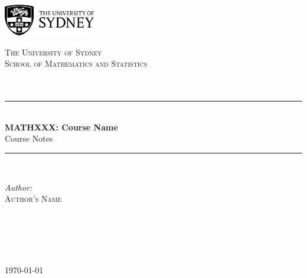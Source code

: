 \documentclass[11pt]{article}
\title{}
\begin{document}
\begin{titlepage}

\newcommand{\HRule}{\rule{\linewidth}{0.5mm}} 
\begin{flushright}
\includegraphics[width=0.3\textwidth]{images/usydNew.png}\\[2cm]
\end{flushright}

\center 

\textsc{\LARGE The University of Sydney}\\[0.75cm]
\textsc{\Large School of Mathematics and Statistics}\\[1cm]

\textsc{\Large}\\[0.25cm] 
\textsc{\large }\\[1cm] 

\HRule \\[0.4cm]
{ \huge \bfseries MATHXXX: Course Name}\\[0.4cm] 
{\Large Course Notes}\\[0.4cm]
\HRule \\[1.25cm]
 
\begin{minipage}{0.4\textwidth}
\begin{flushleft} \large
\emph{Author:}\\
\textsc{Author's Name}\\
\end{flushleft}
\end{minipage}
~
\begin{minipage}{0.4\textwidth}
\begin{flushright} \large\emph{}\\
\end{flushright}
\end{minipage}\\[1.5cm]

{\large \today}\\[1.5cm]

\vfill

\end{titlepage}
\newpage
{}
\cfoot{}
\rhead{}
\thispagestyle{fancy}
\pagestyle{fancy}
\setcounter{page}{1}
\end{document}
